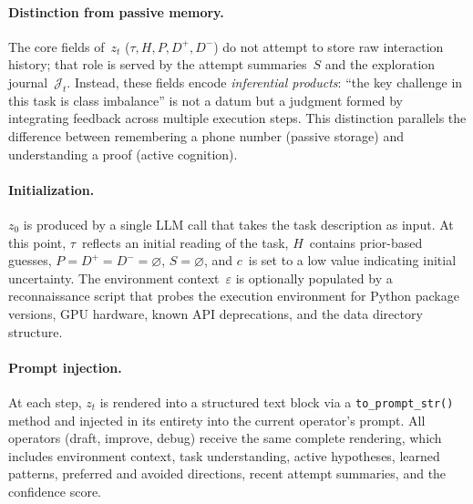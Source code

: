 \documentclass{article} %
\newcommand{\zt}{z_t}
\begin{document}
\paragraph{Distinction from passive memory.}
The core fields of~$\zt$ ($\tau, H, P, D^{+}, D^{-}$) do not attempt to store
raw interaction history; that role is served by the attempt summaries~$S$
and the exploration journal~$\mathcal{J}_t$. Instead, these fields encode
\emph{inferential products}: ``the key challenge in this task is class
imbalance'' is not a datum but a judgment formed by integrating feedback across
multiple execution steps. This distinction parallels the difference between
remembering a phone number (passive storage) and understanding a proof
(active cognition).

\paragraph{Initialization.}
$z_0$ is produced by a single LLM call that takes the task description as
input. At this point, $\tau$~reflects an initial reading of the task,
$H$~contains prior-based guesses, $P = D^{+} = D^{-} = \varnothing$,
$S = \varnothing$, and $c$~is set to a low value indicating initial
uncertainty. The environment context~$\varepsilon$ is optionally populated
by a reconnaissance script that probes the execution environment for Python
package versions, GPU hardware, known API deprecations, and the data directory
structure.

\paragraph{Prompt injection.}
At each step, $\zt$ is rendered into a structured text block via a
\texttt{to\_prompt\_str()} method and injected in its entirety into the
current operator's prompt. All operators (draft, improve, debug) receive the
same complete rendering, which includes environment context, task
understanding, active hypotheses, learned patterns, preferred and avoided
directions, recent attempt summaries, and the confidence score.
\end{document}
